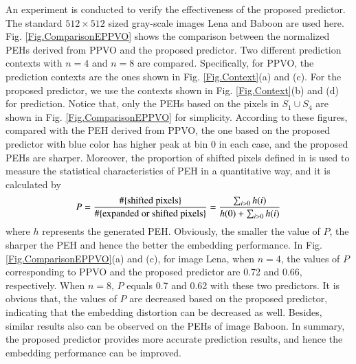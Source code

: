 \documentclass[review,3p,10pt,sort&compress]{elsarticle}
\begin{document}
An experiment is conducted to verify the effectiveness of the proposed predictor. The standard $512 \times 512$ sized gray-scale images Lena and Baboon are used here. Fig. \ref{Fig.ComparisonEPPVO} shows the comparison between the normalized PEHs derived from PPVO and the proposed predictor. Two different prediction contexts with $n = 4$ and $n = 8$ are compared. Specifically, for PPVO, the prediction contexts are the ones shown in Fig. \ref{Fig.Context}(a) and (c). For the proposed predictor, we use the contexts shown in Fig. \ref{Fig.Context}(b) and (d) for prediction. Notice that, only the PEHs based on the pixels in $S_1 \cup S_4$ are shown in Fig. \ref{Fig.ComparisonEPPVO} for simplicity.
According to these figures, compared with the PEH derived from PPVO, the one based on the proposed predictor with blue color has higher peak at bin 0 in each case, and the proposed PEHs are sharper.
Moreover, the proportion of shifted pixels defined in \cite{Li2013PVO} is used to measure the statistical characteristics of PEH in a quantitative way, and it is calculated by
\begin{equation}\label{eq:Pshift}
    P=\frac{\#\{{\rm shifted\ pixels}\}}{\#\{{\rm expanded\ or\ shifted\ pixels}\}} = \frac{\sum_{i > 0}h(i)}{h(0) + \sum_{i > 0}h(i)}
\end{equation}
where $h$ represents the generated PEH. Obviously, the smaller the value of $P$, the sharper the PEH and hence the better the embedding performance. In Fig. \ref{Fig.ComparisonEPPVO}(a) and (c), for image Lena, when $n=4$, the values of $P$ corresponding to PPVO and the proposed predictor are 0.72 and 0.66, respectively. When $n=8$, $P$ equals 0.7 and 0.62 with these two predictors. It is obvious that, the values of $P$ are decreased based on the proposed predictor, indicating that the embedding distortion can be decreased as well. Besides, similar results also can be observed on the PEHs of image Baboon. In summary, the proposed predictor provides more accurate prediction results, and hence the embedding performance can be improved.
\end{document}
